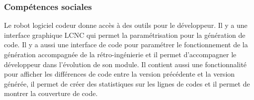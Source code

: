 
\subsubsection{Compétences sociales}
Le robot logiciel codeur donne accès à des outils pour le développeur. Il y a une interface graphique LCNC qui permet la paramétrisation pour la génération de code. Il y a aussi une interface de code pour paramétrer le fonctionnement de la génération accompagnée de la rétro-ingénierie et il permet d'accompagner le développeur dans l'évolution de son module. Il contient aussi une fonctionnalité pour afficher les différences de code entre la version précédente et la version générée, il permet de créer des statistiques sur les lignes de codes et il permet de montrer la couverture de code.








